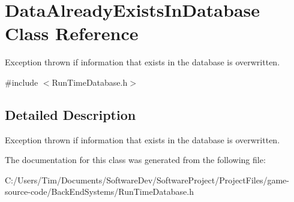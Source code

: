 \hypertarget{class_data_already_exists_in_database}{}\section{Data\+Already\+Exists\+In\+Database Class Reference}
\label{class_data_already_exists_in_database}


Exception thrown if information that exists in the database is overwritten.  




{\ttfamily \#include $<$Run\+Time\+Database.\+h$>$}



\subsection{Detailed Description}
Exception thrown if information that exists in the database is overwritten. 

The documentation for this class was generated from the following file\+:\begin{DoxyCompactItemize}
\item 
C\+:/\+Users/\+Tim/\+Documents/\+Software\+Dev/\+Software\+Project/\+Project\+Files/game-\/source-\/code/\+Back\+End\+Systems/Run\+Time\+Database.\+h\end{DoxyCompactItemize}
